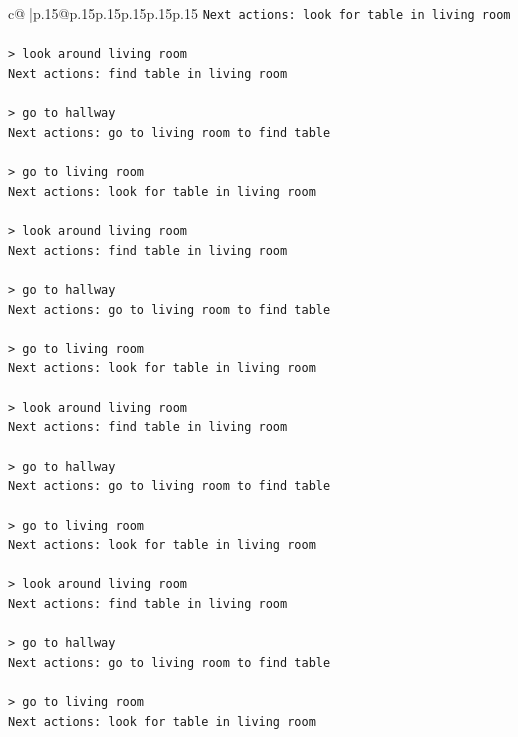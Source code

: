 \documentclass{article}
\begin{document}
{\begin{supertabular}{c@{$\;$}|p{.15\linewidth}@{}p{.15\linewidth}p{.15\linewidth}p{.15\linewidth}p{.15\linewidth}p{.15\linewidth}}
{{{\texttt{Next actions: look for table in living room} \\
\\ 
\texttt{> look around living room} \\
\texttt{Next actions: find table in living room} \\
\\ 
\texttt{> go to hallway} \\
\texttt{Next actions: go to living room to find table} \\
\\ 
\texttt{> go to living room} \\
\texttt{Next actions: look for table in living room} \\
\\ 
\texttt{> look around living room} \\
\texttt{Next actions: find table in living room} \\
\\ 
\texttt{> go to hallway} \\
\texttt{Next actions: go to living room to find table} \\
\\ 
\texttt{> go to living room} \\
\texttt{Next actions: look for table in living room} \\
\\ 
\texttt{> look around living room} \\
\texttt{Next actions: find table in living room} \\
\\ 
\texttt{> go to hallway} \\
\texttt{Next actions: go to living room to find table} \\
\\ 
\texttt{> go to living room} \\
\texttt{Next actions: look for table in living room} \\
\\ 
\texttt{> look around living room} \\
\texttt{Next actions: find table in living room} \\
\\ 
\texttt{> go to hallway} \\
\texttt{Next actions: go to living room to find table} \\
\\ 
\texttt{> go to living room} \\
\texttt{Next actions: look for table in living room} \\
}}}
\end{supertabular}}
\end{document}
